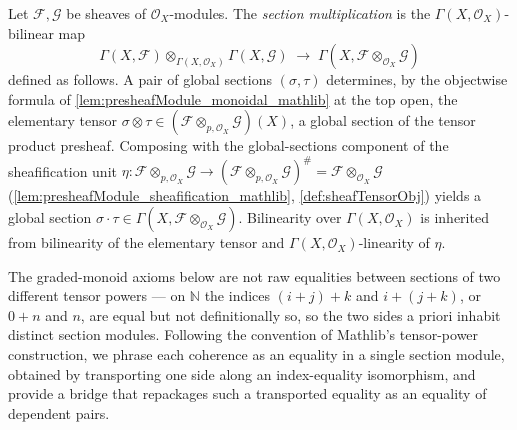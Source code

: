 \begin{definition}
  \label{def:sectionMul}
  Let \(\mathcal{F}, \mathcal{G}\) be sheaves of \(\mathcal{O}_X\)-modules. The
  \emph{section multiplication} is the \(\Gamma(X,\mathcal{O}_X)\)-bilinear map
  \[
    \Gamma(X, \mathcal{F}) \otimes_{\Gamma(X,\mathcal{O}_X)}
      \Gamma(X, \mathcal{G})
    \;\longrightarrow\;
    \Gamma(X, \mathcal{F} \otimes_{\mathcal{O}_X} \mathcal{G})
  \]
  defined as follows. A pair of global sections \((\sigma, \tau)\) determines,
  by the objectwise formula of \cref{lem:presheafModule_monoidal_mathlib} at the
  top open, the elementary tensor \(\sigma \otimes \tau \in
  (\mathcal{F} \otimes_{p,\mathcal{O}_X} \mathcal{G})(X)\), a global section of
  the tensor product presheaf. Composing with the global-sections component of
  the sheafification unit
  \(\eta : \mathcal{F} \otimes_{p,\mathcal{O}_X} \mathcal{G} \to
  (\mathcal{F} \otimes_{p,\mathcal{O}_X} \mathcal{G})^{\#} =
  \mathcal{F} \otimes_{\mathcal{O}_X} \mathcal{G}\)
  (\cref{lem:presheafModule_sheafification_mathlib},
  \cref{def:sheafTensorObj}) yields a global section
  \(\sigma \cdot \tau \in
  \Gamma(X, \mathcal{F} \otimes_{\mathcal{O}_X} \mathcal{G})\). Bilinearity over
  \(\Gamma(X,\mathcal{O}_X)\) is inherited from bilinearity of the elementary
  tensor and \(\Gamma(X,\mathcal{O}_X)\)-linearity of \(\eta\).
\end{definition}

The graded-monoid axioms below are not raw equalities between sections of two
different tensor powers --- on \(\mathbb{N}\) the indices \((i+j)+k\) and
\(i+(j+k)\), or \(0+n\) and \(n\), are equal but not definitionally so, so the two
sides a priori inhabit distinct section modules. Following the convention of Mathlib's tensor-power construction, we phrase each coherence as an
equality in a single section module, obtained by transporting one side
along an index-equality isomorphism, and provide a bridge that repackages such a
transported equality as an equality of dependent pairs.

